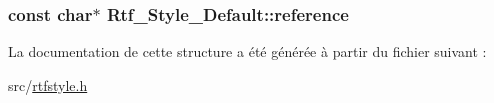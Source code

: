 \subsubsection[{reference}]{\setlength{\rightskip}{0pt plus 5cm}const char$\ast$ Rtf\+\_\+\+Style\+\_\+\+Default\+::reference}\label{struct_rtf___style___default_aba6478eff992fe32a526e6a7bb7571ca}


La documentation de cette structure a été générée à partir du fichier suivant \+:\begin{DoxyCompactItemize}
\item 
src/\hyperlink{rtfstyle_8h}{rtfstyle.\+h}\end{DoxyCompactItemize}
